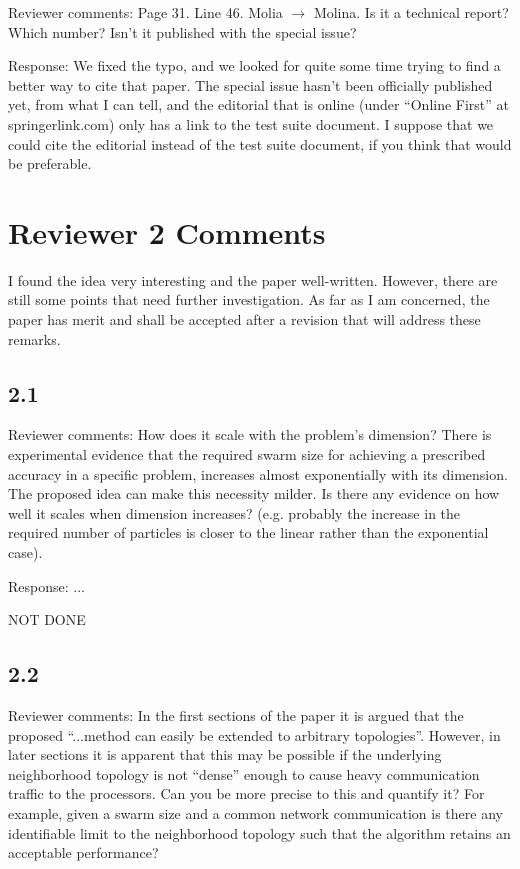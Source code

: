 \documentclass[onecolumn, 12pt]{article}
\begin{document}
Reviewer comments: Page 31. Line 46. Molia $\rightarrow$ Molina. Is it a
technical report?  Which number?  Isn't it published with the special issue?

Response:  We fixed the typo, and we looked for quite some time trying to find
a better way to cite that paper.  The special issue hasn't been officially
published yet, from what I can tell, and the editorial that is online (under
``Online First'' at springerlink.com) only has a link to the test suite
document.  I suppose that we could cite the editorial instead of the test suite
document, if you think that would be preferable.

\section*{Reviewer 2 Comments}

I found the idea very interesting and the paper well-written. However, there
are still some points that need further investigation.  As far as I am
concerned, the paper has merit and shall be accepted after a revision that will
address these remarks.

\subsection*{2.1}

Reviewer comments: How does it scale with the problem's dimension? There is
experimental evidence that the required swarm size for achieving a prescribed
accuracy in a specific problem, increases almost exponentially with its
dimension. The proposed idea can make this necessity milder. Is there any
evidence on how well it scales when dimension increases? (e.g. probably the
increase in the required number of particles is closer to the linear rather
than the exponential case).

Response: ...

NOT DONE

\subsection*{2.2}

Reviewer comments: In the first sections of the paper it is argued that the
proposed ``...method can easily be extended to arbitrary topologies''. However,
in later sections it is apparent that this may be possible if the underlying
neighborhood topology is not ``dense'' enough to cause heavy communication
traffic to the processors.  Can you be more precise to this and quantify it?
For example, given a swarm size and a common network communication is there any
identifiable limit to the neighborhood topology such that the algorithm retains
an acceptable performance?
\end{document}
